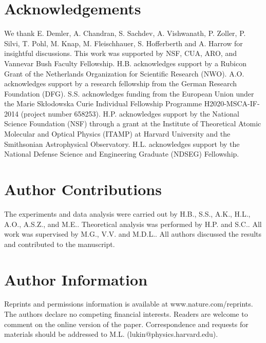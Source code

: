 \documentclass[prl,nobalancelastpage,twocolumn,superscriptaddress,nofootinbib]{revtex4}
\begin{document}
\section{Acknowledgements}
We thank E. Demler, A. Chandran, S. Sachdev, A. Vishwanath, P. Zoller, P. Silvi, T. Pohl, M. Knap, M. Fleischhauer, S. Hofferberth and A. Harrow for insightful discussions. This work was supported by NSF, CUA, ARO, and Vannevar Bush Faculty Fellowship. H.B. acknowledges support by a Rubicon Grant of the Netherlands Organization for Scientific Research (NWO). A.O. acknowledges support by a research fellowship from the German Research Foundation (DFG). S.S. acknowledges funding from the European Union under the Marie Sk\l odowska Curie Individual Fellowship Programme H2020-MSCA-IF-2014 (project number 658253). H.P. acknowledges support by the National Science Foundation (NSF) through a grant at the Institute of Theoretical Atomic Molecular and Optical Physics (ITAMP) at Harvard University and the Smithsonian Astrophysical Observatory. H.L. acknowledges support by the National Defense Science and Engineering Graduate (NDSEG) Fellowship.

\section{Author Contributions} The experiments and data analysis were carried out by H.B., S.S., A.K., H.L., A.O., A.S.Z., and M.E.. Theoretical analysis was performed by H.P. and S.C.. All work was supervised by M.G., V.V. and  M.D.L.. All authors discussed the results and contributed to the manuscript.

\section{Author Information} Reprints and permissions information is available at www.nature.com/reprints. The authors declare no competing financial interests. Readers are welcome to comment on the online version of the paper. Correspondence and requests for materials should be addressed to M.L. (lukin@physics.harvard.edu).


\FloatBarrier



\end{document}
